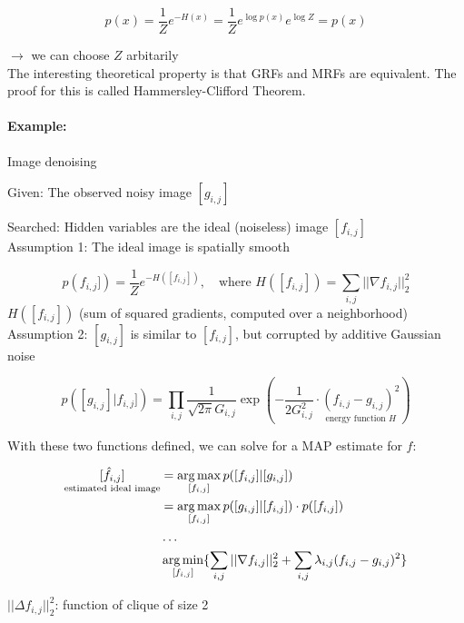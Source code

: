 \begin{equation*}
	p(x) = \frac{1}{Z} e^{-H(x)} = \frac{1}{Z} e^{\log p(x)} e^{\log Z}  = p(x)
\end{equation*}

$\rightarrow$ we can choose $Z$ arbitarily\\

The interesting theoretical property is that GRFs and MRFs are equivalent. The proof for this is called Hammersley-Clifford Theorem.

\paragraph{Example:} Image denoising

Given: The observed noisy image $[g_{i,j}]$

Searched: Hidden variables are the ideal (noiseless) image $[f_{i,j}]$\\

Assumption 1: The ideal image is spatially smooth

\begin{equation*}
	p(f_{i,j}]) = \frac{1}{Z} e^{-H([f_{i,j}])}, \quad \text{where } H([f_{i,j}]) = \sum_{i,j} ||\nabla f_{i,j}||_2^2
\end{equation*}
$ H([f_{i,j}]) $ (sum of squared gradients, computed over a neighborhood)\\

Assumption 2: $[g_{i,j}]$ is similar to $[f_{i,j}]$, but corrupted by additive Gaussian noise

\begin{equation*}
	p([g_{i,j}] | f_{i,j}]) = \prod_{i,j} \frac{1}{\sqrt{2 \pi} G_{i,j}} \exp(- \frac{1}{2 G_{i,j}^2} \cdot \underset{\text{energy function $H$}}{(f_{i,j} - g_{i,j})^2})
\end{equation*}

With these two functions defined, we can solve for a MAP estimate for $f$:

\begin{align*}
	\underset{\text{estimated ideal image}}{[\hat{f}_{i,j}]} &= \operatorname*{arg\,max}_{[f_{i,j}]} p([f_{i,j}] | [g_{i,j}])\\
					&= \operatorname*{arg\,max}_{[f_{i,j}]} p([g_{i,j}] | [f_{i,j}]) \cdot p([f_{i,j}])\\
					& \dots\\
					& \operatorname*{arg\,min}_{[f_{i,j}]} \{ \sum_{i,j} ||\nabla f_{i,j}||_2^2 + \sum_{i,j} \lambda_{i,j} (f_{i,j} - g_{i,j})^2 \}
\end{align*}

\(||\Delta f_{i,j}||_2^2\): function of clique of size 2


